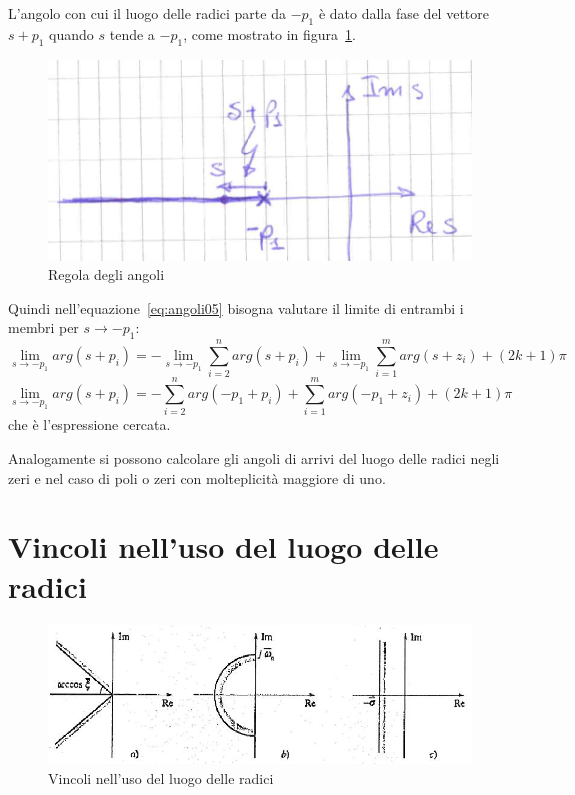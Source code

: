 \documentclass[a4paper]{report}
\begin{document}
L'angolo con cui il luogo delle radici parte da $-p_1$ \`e dato dalla
fase del vettore $s + p_1$ quando $s$ tende a $-p_1$, come mostrato in
figura~\ref{fig:regolaAngoli}.
\begin{figure}[!h]
  \begin{center}
    \includegraphics[scale=0.3]{./images/regolaAngoli}
    \caption{Regola degli angoli}\label{fig:regolaAngoli}
  \end{center}
\end{figure}
Quindi nell'equazione~\ref{eq:angoli05} bisogna valutare il limite di
entrambi i membri per $s \to -p_1$:
\[
\lim_{s \to -p_1} arg(s + p_i) = - \lim_{s \to -p_1}\sum\limits_{i = 2}^{n} arg(s + p_i) +
  \lim_{s \to -p_1}\sum\limits_{i = 1}^{m} arg(s + z_i) + (2k + 1)\pi
\]
\[
\lim_{s \to -p_1} arg(s + p_i) = - \sum\limits_{i = 2}^{n} arg(-p_1 + p_i) +
  \sum\limits_{i = 1}^{m} arg(-p_1 + z_i) + (2k + 1)\pi
\]
che \`e l'espressione cercata.

Analogamente si possono calcolare gli angoli di arrivi del luogo delle
radici negli zeri e nel caso di poli o zeri con molteplicit\`a
maggiore di uno.
\section{Vincoli nell'uso del luogo delle radici}
\begin{figure}[!h]
  \begin{center}
    \includegraphics[scale=0.4]{./images/vincoliLuogo}
    \caption{Vincoli nell'uso del luogo delle
      radici}\label{fig:vincoliLuogo}
  \end{center}
\end{figure}
\end{document}
